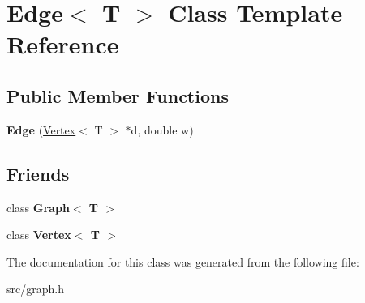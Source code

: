 \hypertarget{class_edge}{}\section{Edge$<$ T $>$ Class Template Reference}
\label{class_edge}
\subsection*{Public Member Functions}
\begin{DoxyCompactItemize}
\item 
\mbox{\label{class_edge_a9da861a03f920c89984be33515a5d870}} 
{\bfseries Edge} (\mbox{\hyperlink{class_vertex}{Vertex}}$<$ T $>$ $\ast$d, double w)
\end{DoxyCompactItemize}
\subsection*{Friends}
\begin{DoxyCompactItemize}
\item 
\mbox{\label{class_edge_aefa9b76cd57411c5354e5620dc2d84dd}} 
class {\bfseries Graph$<$ T $>$}
\item 
\mbox{\label{class_edge_a2e120a12dec663fa334633b4f26cbed8}} 
class {\bfseries Vertex$<$ T $>$}
\end{DoxyCompactItemize}


The documentation for this class was generated from the following file\+:\begin{DoxyCompactItemize}
\item 
src/graph.\+h\end{DoxyCompactItemize}
